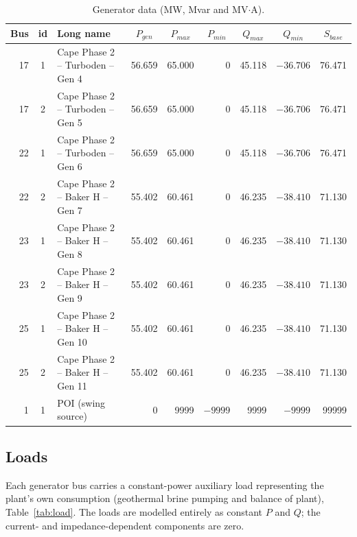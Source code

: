 \begin{table}[!ht]
\centering
\begin{tabularx}{\linewidth}{@{}r c X r r r r r r@{}}
\toprule
\multicolumn{1}{c}{\textbf{Bus}} & \multicolumn{1}{c}{\textbf{id}} & \textbf{Long name} & \multicolumn{1}{c}{\textbf{$P_{gen}$}} & \multicolumn{1}{c}{\textbf{$P_{max}$}} & \multicolumn{1}{c}{\textbf{$P_{min}$}} & \multicolumn{1}{c}{\textbf{$Q_{max}$}} & \multicolumn{1}{c}{\textbf{$Q_{min}$}} & \multicolumn{1}{c}{\textbf{$S_{base}$}} \\
\midrule
17 & 1 & Cape Phase 2 -- Turboden -- Gen 4  & 56.659 & 65.000 & 0 & 45.118 & $-36.706$ & 76.471 \\
17 & 2 & Cape Phase 2 -- Turboden -- Gen 5  & 56.659 & 65.000 & 0 & 45.118 & $-36.706$ & 76.471 \\
22 & 1 & Cape Phase 2 -- Turboden -- Gen 6  & 56.659 & 65.000 & 0 & 45.118 & $-36.706$ & 76.471 \\
22 & 2 & Cape Phase 2 -- Baker H -- Gen 7   & 55.402 & 60.461 & 0 & 46.235 & $-38.410$ & 71.130 \\
23 & 1 & Cape Phase 2 -- Baker H -- Gen 8   & 55.402 & 60.461 & 0 & 46.235 & $-38.410$ & 71.130 \\
23 & 2 & Cape Phase 2 -- Baker H -- Gen 9   & 55.402 & 60.461 & 0 & 46.235 & $-38.410$ & 71.130 \\
25 & 1 & Cape Phase 2 -- Baker H -- Gen 10  & 55.402 & 60.461 & 0 & 46.235 & $-38.410$ & 71.130 \\
25 & 2 & Cape Phase 2 -- Baker H -- Gen 11  & 55.402 & 60.461 & 0 & 46.235 & $-38.410$ & 71.130 \\
\midrule
 1 & 1 & POI (swing source) & 0 & 9999 & $-9999$ & 9999 & $-9999$ & 99999 \\
\bottomrule
\end{tabularx}
\caption{Generator data (MW, Mvar and MV$\cdot$A).}
\label{tab:gen}
\end{table}

\subsection{Loads}

Each generator bus carries a constant-power auxiliary load representing the plant's
own consumption (geothermal brine pumping and balance of plant), Table~\ref{tab:load}.
The loads are modelled entirely as constant $P$ and $Q$; the current- and
impedance-dependent components are zero.

